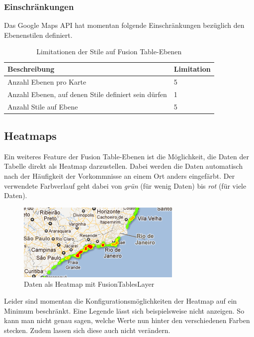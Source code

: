 \subsubsection{Einschränkungen}
\label{fusiontableslayer-styles-restrictions}
Das Google Maps \gls{API} hat momentan folgende Einschränkungen bezüglich den Ebenenstilen definiert.

\begin{table}[H]
\centering
\begin{tabular}{|l|l|}
\hline 
\textbf{Beschreibung} & \textbf{Limitation} \\ 
\hline 
Anzahl Ebenen pro Karte & 5 \\ 
\hline 
Anzahl Ebenen, auf denen Stile definiert sein dürfen & 1 \\ 
\hline 
Anzahl Stile auf Ebene & 5 \\ 
\hline 
\end{tabular} 
\caption{Limitationen der Stile auf Fusion Table-Ebenen}
\label{fusiontableslayer-stlyes-limitations}
\end{table}

\subsection{Heatmaps}
Ein weiteres Feature der Fusion Table-Ebenen ist die Möglichkeit, die Daten der Tabelle direkt als Heatmap darzustellen. Dabei werden die Daten automatisch nach der Häufigkeit der Vorkommnisse an einem Ort anders eingefärbt. Der verwendete Farbverlauf geht dabei von \emph{grün} (für wenig Daten) bis \emph{rot} (für viele Daten).

\begin{figure}[!ht]
	\centering
	\includegraphics{images/einfuehrung/gmap_fusiontableslayer_heatmap}
	\caption{Daten als Heatmap mit FusionTablesLayer}
	\label{fusiontableslayer-heatmap}
\end{figure}

Leider sind momentan die Konfigurationsmöglichkeiten der Heatmap auf ein Minimum beschränkt. Eine Legende lässt sich beispielsweise nicht anzeigen. So kann man nicht genau sagen, welche Werte nun hinter den verschiedenen Farben stecken. Zudem lassen sich diese auch nicht verändern.

